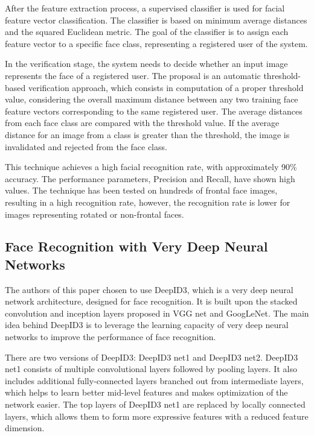 \documentclass[12pt,a4paper,twocolumn]{article}
\begin{document}
After the feature extraction process, a supervised classifier is used for facial feature vector classification.
The classifier is based on minimum average distances and the squared Euclidean metric.
The goal of the classifier is to assign each feature vector to a specific face class, representing a registered user of the system.

In the verification stage, the system needs to decide whether an input image represents the face of a registered user.
The proposal is an automatic threshold-based verification approach, which consists in computation of a proper threshold value, considering the overall maximum distance between any two training face feature vectors corresponding to the same registered user.
The average distances from each face class are compared with the threshold value. If the average distance for an image from a class is greater than the threshold, the image is invalidated and rejected from the face class.

This technique achieves a high facial recognition rate, with approximately 90\% accuracy.  The performance parameters, Precision and Recall, have shown high values. The technique has been tested on hundreds of frontal face images, resulting in a high recognition rate, however, the recognition rate is lower for images representing rotated or non-frontal faces. 
\subsection{ Face Recognition with Very Deep Neural Networks \cite{state3}}
\par The authors of this paper chosen to use DeepID3, which is a very deep neural network architecture, designed for face recognition. It is built upon the stacked convolution and inception layers proposed in VGG net and GoogLeNet. The main idea behind DeepID3 is to leverage the learning capacity of very deep neural networks to improve the performance of face recognition.

\par There are two versions of DeepID3: DeepID3 net1 and DeepID3 net2. DeepID3 net1 consists of multiple convolutional layers followed by pooling layers. It also includes additional fully-connected layers branched out from intermediate layers, which helps to learn better mid-level features and makes optimization of the network easier. The top layers of DeepID3 net1 are replaced by locally connected layers, which allows them to form more expressive features with a reduced feature dimension.
\end{document}
